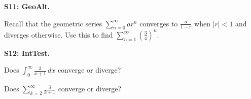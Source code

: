 \documentclass[12pt]{article}
\newcommand{\<}{\left\langle}
\renewcommand{\>}{\right\rangle}
\newcommand{\exerciseHeader}[4]{


  \vspace{0.5em}
  \textbf{#2}
  \vspace{0.5em}

}
\begin{document}
\begin{multicols}{2}
\exerciseHeader{2017 July 13}{S11: GeoAlt.}{
Determine if a geometric series or alternating series is convergent or
divergent.
}{2/3}

Recall that the geometric series \(\sum_{n=0}^\infty ar^n\) converges to
\(\frac{a}{1-r}\) when \(|r|<1\) and diverges otherwise.
Use this to find \(\sum_{n=1}^\infty (\frac{3}{4})^n\).



%
%
%
%

%
%
%
%

%
%
%
%

%
%

\exerciseHeader{2017 July 14}{S12: IntTest.}{
Use the integral test to determine series convergence.
}{2/3}

Does \(\int_0^\infty\frac{3}{x+1}\,dx\) converge or diverge?

Does \(\sum_{k=2}^\infty\frac{3}{k+1}\) converge or diverge?



%

%


\end{multicols}
\end{document}
